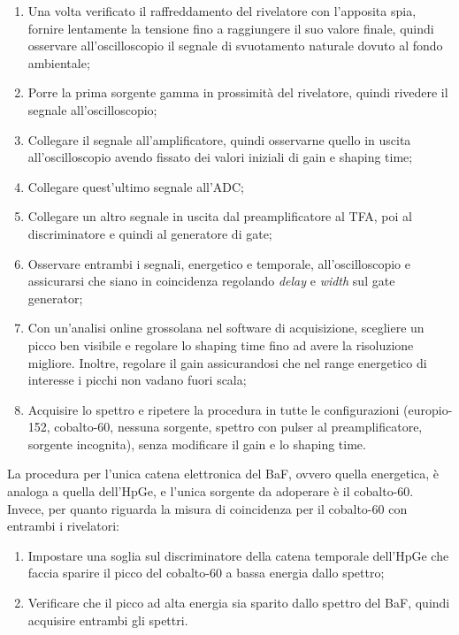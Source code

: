 \documentclass{article}
\begin{document}
                \begin{enumerate}
                    \item Una volta verificato il raffreddamento del rivelatore con l'apposita spia, fornire lentamente la tensione fino a raggiungere il suo valore finale, quindi osservare all'oscilloscopio il segnale di svuotamento naturale dovuto al fondo ambientale;
                    \item Porre la prima sorgente gamma in prossimità del rivelatore, quindi rivedere il segnale all'oscilloscopio;
                    \item Collegare il segnale all'amplificatore, quindi osservarne quello in uscita all'oscilloscopio avendo fissato dei valori iniziali di gain e shaping time;
                    \item Collegare quest'ultimo segnale all'ADC;
                    \item Collegare un altro segnale in uscita dal preamplificatore al TFA, poi al discriminatore e quindi al generatore di gate;
                    \item Osservare entrambi i segnali, energetico e temporale, all'oscilloscopio e assicurarsi che siano in coincidenza regolando \textit{delay} e \textit{width} sul gate generator;
                    \item Con un'analisi online grossolana nel software di acquisizione, scegliere un picco ben visibile e regolare lo shaping time fino ad avere la risoluzione migliore. Inoltre, regolare il gain assicurandosi che nel range energetico di interesse i picchi non vadano fuori scala;
                    \item Acquisire lo spettro e ripetere la procedura in tutte le configurazioni (europio-152, cobalto-60, nessuna sorgente, spettro con pulser al preamplificatore, sorgente incognita), senza modificare il gain e lo shaping time.
                \end{enumerate}

                La procedura per l'unica catena elettronica del BaF, ovvero quella energetica, è analoga a quella dell'HpGe, e l'unica sorgente da adoperare è il cobalto-60. Invece, per quanto riguarda la misura di coincidenza per il cobalto-60 con entrambi i rivelatori:
                \begin{enumerate}
                    \item Impostare una soglia sul discriminatore della catena temporale dell'HpGe che faccia sparire il picco del cobalto-60 a bassa energia dallo spettro;
                    \item Verificare che il picco ad alta energia sia sparito dallo spettro del BaF, quindi acquisire entrambi gli spettri.
                \end{enumerate}
\end{document}
